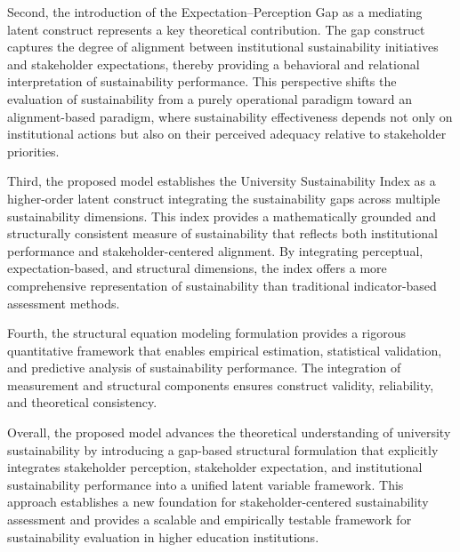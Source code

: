 \documentclass[11pt,a4paper]{article}
\begin{document}
Second, the introduction of the Expectation--Perception Gap as a mediating latent construct represents a key theoretical contribution. The gap construct captures the degree of alignment between institutional sustainability initiatives and stakeholder expectations, thereby providing a behavioral and relational interpretation of sustainability performance. This perspective shifts the evaluation of sustainability from a purely operational paradigm toward an alignment-based paradigm, where sustainability effectiveness depends not only on institutional actions but also on their perceived adequacy relative to stakeholder priorities.

Third, the proposed model establishes the University Sustainability Index as a higher-order latent construct integrating the sustainability gaps across multiple sustainability dimensions. This index provides a mathematically grounded and structurally consistent measure of sustainability that reflects both institutional performance and stakeholder-centered alignment. By integrating perceptual, expectation-based, and structural dimensions, the index offers a more comprehensive representation of sustainability than traditional indicator-based assessment methods.

Fourth, the structural equation modeling formulation provides a rigorous quantitative framework that enables empirical estimation, statistical validation, and predictive analysis of sustainability performance. The integration of measurement and structural components ensures construct validity, reliability, and theoretical consistency.

Overall, the proposed model advances the theoretical understanding of university sustainability by introducing a gap-based structural formulation that explicitly integrates stakeholder perception, stakeholder expectation, and institutional sustainability performance into a unified latent variable framework. This approach establishes a new foundation for stakeholder-centered sustainability assessment and provides a scalable and empirically testable framework for sustainability evaluation in higher education institutions.



\end{document}

